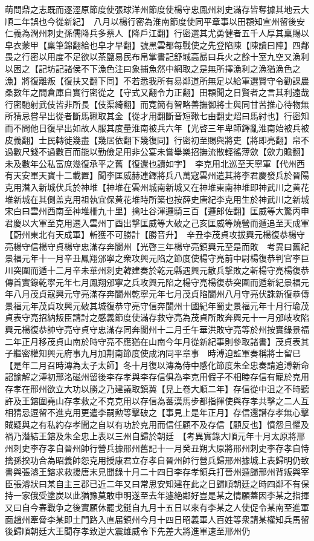 萌問鼎之志既而逐涇原節度使張球洋州節度使楊守忠鳳州刺史滿存皆奪據其地云大順二年誤也今從新紀】　八月以楊行密為淮南節度使同平章事以田頵知宣州留後安仁義為潤州刺史孫儒降兵多蔡人【降戶江翻】行密選其尤勇健者五千人厚其稟賜以皁衣蒙甲【稟筆錦翻給也皁才早翻】號黑雲都每戰使之先登陷陳【陳讀曰陣】四鄰畏之行密以用度不足欲以茶鹽易民布帛掌書記舒城高勗曰兵火之餘十室九空又漁利以困之【記坊記諸侯不下漁色注曰象捕魚然中網取之是無所擇漁利之漁猶漁色之漁】將復離叛【復扶又翻下同】不若悉我所有易鄰道所無足以給軍選賢守令勸課農桑數年之間倉庫自實行密從之【守式又翻令力正翻】田頵聞之日賢者之言其利遠哉行密馳射武伎皆非所長【伎渠綺翻】而寛簡有智略善撫御將士與同甘苦推心待物無所猜忌嘗早出從者斷馬鞦取其金【從才用翻斷音短鞦七由翻史炤曰馬紂也】行密知而不問他日復早出如故人服其度量淮南被兵六年【光啓三年卑師鐸亂淮南始被兵被皮義翻】士民轉徙幾盡【幾居依翻下幾復同】行密初至賜與將吏【將即亮翻】帛不過數尺錢不過數百而能以勤儉足用非公宴未嘗舉樂招撫流散輕徭薄歛【歛力贍翻】未及數年公私富庶幾復承平之舊【復還也讀如字】　李克用北巡至天寧軍【代州西有天安軍天寶十二載置】聞李匡威赫連鐸將兵八萬寇雲州遣其將李君慶發兵於晉陽克用潛入新城伏兵於神堆【神堆在雲州城南新城又在神堆東南神堆即神武川之黄花堆新城在其側盖克用祖執宜保黄花堆時所築也按薛史唐紀李克用生於神武川之新城宋白曰雲州西南至神堆柵九十里】擒吐谷渾邏騎三百【邏郎佐翻】匡威等大驚丙申君慶以大軍至克用遷入雲州丁酉出撃匡威等大破之己亥匡威等燒營而遁追至天成軍【蔚州東北有天成軍】斬獲不可勝計【勝音升】　辛丑李茂貞攻拔興元楊復恭楊守亮楊守信楊守貞楊守忠滿存奔閬州【光啓三年楊守亮鎮興元至是而敗　考異曰舊紀景福元年十一月辛丑鳳翔邠寧之衆攻興元陷之節度使楊守亮前中尉楊復恭判官李巨川突圍而遁十二月辛未華州刺史韓建奏於乾元縣遇興元散兵撃敗之斬楊守亮楊復恭傳首實錄乾寜元年七月鳳翔邠寧之兵攻興元陷之楊守亮楊復恭突圍而遁新紀景福元年八月茂貞寇興元守亮滿存奔閬州乾寧元年七月茂貞陷閬州八月守亮伏誅新復恭傳景福元年茂貞攻興元破其城復恭守亮守信奔閬州十國紀年蜀史景福元年十月行瑜茂貞表守亮招納叛臣請討之感義節度使滿存救守亮為茂貞所敗奔興元十一月邠岐攻陷興元楊復恭帥守亮守貞守忠滿存同奔閬州十二月壬午華洪敗守亮等於州按實錄景福二年正月移茂貞山南於時守亮不應猶在山南今年月從新紀事則參取諸書】茂貞表其子繼密權知興元府事九月加荆南節度使成汭同平章事　時溥迫監軍奏稱將士留已【是年二月召時漙為太子太師】冬十月復以漙為侍中感化節度朱全忠奏請追溥新命詔諭解之溥初邢洺磁州留後李存孝與李存信俱為李克用假子不相睦存信有寵於克用存孝在邢州欲立大功以勝之乃建議取鎮冀【見上卷大順二年】存信從中沮之不時聽許及王鎔圍堯山存孝救之不克克用以存信為蕃漢馬步都指揮使與存孝共擊之二人互相猜忌逗留不進克用更遣李嗣勲等擊破之【事見上是年正月】存信還譖存孝無心擊賊疑與之有私約存孝聞之自以有功於克用而信任顧不及存信【顧反也】憤怨且懼及禍乃潛結王鎔及朱全忠上表以三州自歸於朝廷　【考異實錄大順元年十月太原將邢州刺史李存孝自晉州帥行營兵據邢州舊記十一月癸丑朔大原將邢州刺史李存孝自恃擒孫揆功合為昭義帥怨克用授康君立存孝自晉州帥行營兵歸邢州據城上表歸明仍致書與張濬王鎔求救援唐末見聞錄十月二十四日李存孝領兵打晉州遁歸邢州背叛與宰臣張濬狀曰某自主三郡已近二年又曰常思安知建在此之日歸順朝廷之時四鄰不有保持一家俄受塗炭以此猶豫莫敢申明遂至去年遽絶鄰好豈是某之情願蓋因李某之指揮又曰自今春戰争之後實願休罷戈鋌自九月十五日以來有李某之人使促令某南至進軍面趙州牽脅李某即土門路入直届鎮州今月十四日昭義軍人百姓等衆請某權知兵馬留後歸順朝廷大王聞存孝致逆大震雄威令下先差大將進軍速至邢州仍